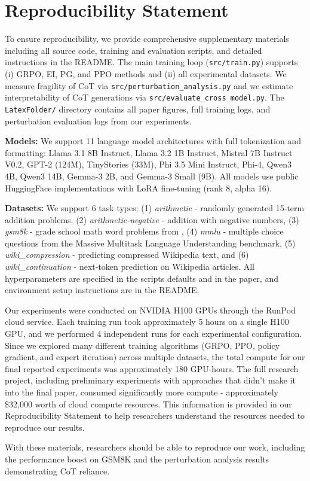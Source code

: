 \documentclass{article}
\begin{document}
\section{Reproducibility Statement}
To ensure reproducibility, we provide comprehensive supplementary materials including all source code, training and evaluation scripts, and detailed instructions in the README. The main training loop (\texttt{src/train.py}) supports (i) GRPO, EI, PG, and PPO methods and (ii) all experimental datasets. We measure fragility of CoT via \texttt{src/perturbation\_analysis.py} and we estimate interpretability of CoT generations via \texttt{src/evaluate\_cross\_model.py}. The \texttt{LatexFolder/} directory contains all paper figures, full training logs, and perturbation evaluation logs from our experiments.

\textbf{Models:} We support 11 language model architectures with full tokenization and formatting: Llama 3.1 8B Instruct, Llama 3.2 1B Instruct, Mistral 7B Instruct V0.2, GPT-2 (124M), TinyStories (33M), Phi 3.5 Mini Instruct, Phi-4, Qwen3 4B, Qwen3 14B, Gemma-3 2B, and Gemma-3 Small (9B). All models use public HuggingFace implementations with LoRA fine-tuning (rank 8, alpha 16).

\textbf{Datasets:} We support 6 task types: (1) \textit{arithmetic} - randomly generated 15-term addition problems, (2) \textit{arithmetic-negative} - addition with negative numbers, (3) \textit{gsm8k} - grade school math word problems from \citet{cobbe2021gsm8k}, (4) \textit{mmlu} - multiple choice questions from the Massive Multitask Language Understanding benchmark, (5) \textit{wiki\_compression} - predicting compressed Wikipedia text, and (6) \textit{wiki\_continuation} - next-token prediction on Wikipedia articles. All hyperparameters are specified in the scripts defaults and in the paper, and environment setup instructions are in the README. 

Our experiments were conducted on NVIDIA H100 GPUs through the RunPod cloud service. Each training run took approximately 5 hours on a single H100 GPU, and we performed 4 independent runs for each experimental configuration. Since we explored many different training algorithms (GRPO, PPO, policy gradient, and expert iteration) across multiple datasets, the total compute for our final reported experiments was approximately 180 GPU-hours. The full research project, including preliminary experiments with approaches that didn't make it into the final paper, consumed significantly more compute - approximately \$32,000 worth of cloud compute resources. This information is provided in our Reproducibility Statement to help researchers understand the resources needed to reproduce our results.

With these materials, researchers should be able to reproduce our work, including the performance boost on GSM8K and the perturbation analysis results demonstrating CoT reliance.



\end{document}

